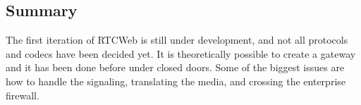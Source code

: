\subsection{Summary}
The first iteration of RTCWeb is still under development, and not all protocols and codecs have been decided yet. It is theoretically possible to create a gateway and it has been done before under closed doors. Some of the biggest issues are how to handle the signaling, translating the media, and crossing the enterprise firewall.



